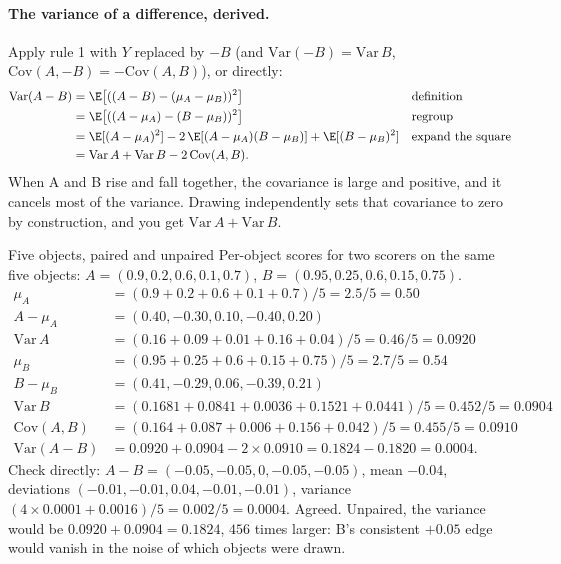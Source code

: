 \paragraph{The variance of a difference, derived.} Apply rule 1 with $Y$ replaced by $-B$ (and
$\mathrm{Var}(-B) = \mathrm{Var}\,B$, $\mathrm{Cov}(A, -B) = -\mathrm{Cov}(A, B)$), or directly:
\begin{align*}
\mathrm{Var}(A - B) &= \E\big[((A - B) - (\mu_A - \mu_B))^2\big] && \text{definition}\\
&= \E\big[((A - \mu_A) - (B - \mu_B))^2\big] && \text{regroup}\\
&= \E[(A - \mu_A)^2] - 2\,\E[(A - \mu_A)(B - \mu_B)] + \E[(B - \mu_B)^2] && \text{expand the square}\\
&= \mathrm{Var}\,A + \mathrm{Var}\,B - 2\,\mathrm{Cov}(A, B).
\end{align*}
When A and B rise and fall together, the covariance is large and positive, and it cancels most of the variance. Drawing
independently sets that covariance to zero by construction, and you get $\mathrm{Var}\,A + \mathrm{Var}\,B$.

\begin{worked}[label={we:bootstrap:var}]{Five objects, paired and unpaired}
Per-object scores\tagA{} for two scorers on the same five objects:
$A = (0.9, 0.2, 0.6, 0.1, 0.7)$, $B = (0.95, 0.25, 0.6, 0.15, 0.75)$.
\begin{align*}
\mu_A &= (0.9 + 0.2 + 0.6 + 0.1 + 0.7)/5 = 2.5/5 = 0.50\\
A - \mu_A &= (0.40, -0.30, 0.10, -0.40, 0.20)\\
\mathrm{Var}\,A &= (0.16 + 0.09 + 0.01 + 0.16 + 0.04)/5 = 0.46/5 = 0.0920\\
\mu_B &= (0.95 + 0.25 + 0.6 + 0.15 + 0.75)/5 = 2.7/5 = 0.54\\
B - \mu_B &= (0.41, -0.29, 0.06, -0.39, 0.21)\\
\mathrm{Var}\,B &= (0.1681 + 0.0841 + 0.0036 + 0.1521 + 0.0441)/5 = 0.452/5 = 0.0904\\
\mathrm{Cov}(A,B) &= (0.164 + 0.087 + 0.006 + 0.156 + 0.042)/5 = 0.455/5 = 0.0910\\
\mathrm{Var}(A - B) &= 0.0920 + 0.0904 - 2 \times 0.0910 = 0.1824 - 0.1820 = 0.0004.
\end{align*}
Check directly: $A - B = (-0.05, -0.05, 0, -0.05, -0.05)$, mean $-0.04$, deviations
$(-0.01, -0.01, 0.04, -0.01, -0.01)$, variance $(4 \times 0.0001 + 0.0016)/5 = 0.002/5 = 0.0004$. Agreed. Unpaired, the
variance would be $0.0920 + 0.0904 = 0.1824$, $456$ times larger\tagC{}: B's consistent $+0.05$ edge would vanish in the
noise of which objects were drawn.
\end{worked}

